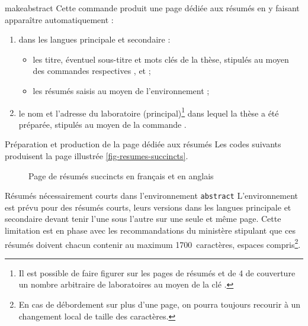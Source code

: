 \begin{docCommand}[doc description=\mandatory]{makeabstract}{}
  Cette commande produit une page dédiée aux résumés en y faisant
  apparaître automatiquement :
  \begin{enumerate}
  \item dans les langues principale et secondaire :
    \begin{itemize}
    \item les titre, éventuel sous-titre et mots clés de la thèse, stipulés au
      moyen des commandes respectives ,  et
       ;
    \item les résumés saisis au moyen de l'environnement  ;
    \end{itemize}
  \item le nom et l'adresse du laboratoire (principal)\footnote{Il est possible
      de faire figurer sur les pages de résumés et de 4\ieme{} de couverture un
      nombre arbitraire de laboratoires au moyen de la clé
      .} dans lequel la thèse a été préparée, stipulés
    au moyen de la commande .
  \end{enumerate}
\end{docCommand}

\begin{dbexample}{Préparation et production de la page dédiée aux résumés}{}
  Les codes suivants produisent la page illustrée \vref{fig-resumes-succincts}.
\end{dbexample}

\begin{figure}[htbp]
  \centering
  \caption{Page de résumés succincts en français et en anglais}
  \label{fig-resumes-succincts}
\end{figure}

\begin{dbwarning}{Résumés nécessairement courts dans l'environnement
    \protect\lstinline+abstract+}{}
  L'environnement  est prévu pour des résumés courts, leurs
  versions dans les langues principale et secondaire devant tenir l'une sous
  l'autre sur une seule et même page. Cette limitation est en phase avec les
  recommandations du ministère stipulant que ces résumés doivent chacun
  contenir au maximum 1700~caractères, espaces compris\footnote{En cas de
    débordement sur plus d'une page, on pourra toujours recourir à un
    changement local de taille des caractères.}.
\end{dbwarning}

